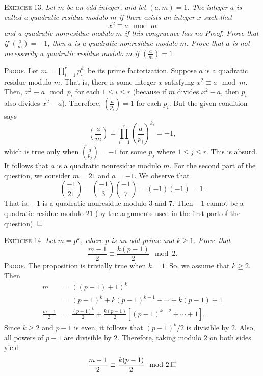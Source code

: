 \documentclass[11pt, leqno]{article}
\newcommand{\done}{\ensuremath{\hfill\square}}
\begin{document}
\textsc{Exercise 13}. \emph{Let $m$ be an odd integer, and let $(a,m) = 1$. The integer $a$ is called a quadratic residue modulo $m$ if there exists an integer $x$ such that 
\begin{displaymath}
x^2 \equiv a \mod m
\end{displaymath}
and a quadratic nonresidue modulo $m$ if this congruence has no Proof. Prove that if $\left( \frac{a}{m} \right) = -1$, then $a$ is a quadratic nonresidue modulo $m$. Prove that $a$ is not necessarily a quadratic residue modulo $m$ if $\left( \frac{a}{m} \right) = 1$.}

\textsc{Proof}. Let $m = \prod_{i=1}^r p_i^{k_i}$ be its prime factorization. Suppose $a$ is a quadratic residue modulo $m$. That is, there is some integer $x$ satisfying $x^2 \equiv a \mod m$. Then, $x^2 \equiv a \mod p_i$ for each $1 \leq i \leq r$ (because if $m$ divides $x^2-a$, then $p_i$ also divides $x^2-a$). Therefore, $\left( \frac{a}{p_i} \right) = 1$ for each $p_i$. But the given condition says
\begin{displaymath}
\left( \frac{a}{m} \right) = \prod_{i=1}^r \left( \frac{a}{p_i} \right)^{k_i} = -1,
\end{displaymath}
which is true only when $\left( \frac{a}{p_j} \right) = -1$ for some $p_j$ where $1\leq j \leq r$. This is absurd. It follows that $a$ is a quadratic nonresidue modulo $m$. For the second part of the question, we consider $m = 21$ and $a=-1$. We observe that 
\begin{displaymath}
\left( \frac{-1}{21} \right) = \left( \frac{-1}{3} \right) \left( \frac{-1}{7} \right) = (-1)(-1) = 1.
\end{displaymath}
That is, $-1$ is a quadratic nonresidue modulo $3$ and $7$. Then $-1$ cannot be a quadratic residue modulo $21$ (by the arguments used in the first part of the question). \done

\textsc{Exercise 14}. \emph{Let $m = p^k$, where $p$ is an odd prime and $k\geq 1$. Prove that 
\begin{displaymath}
\frac{m-1}{2} \equiv \frac{k(p-1)}{2} \mod 2.
\end{displaymath}}\textsc{Proof}. The proposition is trivially true when $k=1$. So, we assume that $k\geq 2$. Then
\begin{align*}
  m &= ((p-1)+1)^k \\
    &= (p-1)^k + k(p-1)^{k-1} + \cdots + k(p-1) + 1 \\
  \frac{m-1}{2} &= \frac{(p-1)^k}{2} + \frac{k(p-1)}{2}[(p-1)^{k-2} + \cdots + 1].
\end{align*} Since $k\geq 2$ and $p-1$ is even, it follows that $(p-1)^k/2$ is divisible by $2$. Also, all powers of $p-1$ are divisible by $2$. Therefore, taking modulo $2$ on both sides yield 
\begin{displaymath}
\frac{m-1}{2} \equiv \frac{k(p-1)}{2} \mod 2.\done
\end{displaymath}
\end{document}
